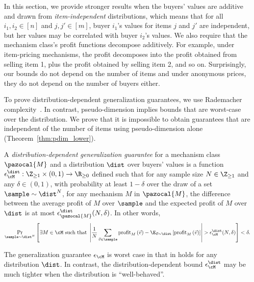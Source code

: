 
In this section, we provide stronger results when the buyers' values are additive and drawn from \emph{item-independent} distributions, which means that for all $i_1, i_2 \in [n]$ and $j ,j' \in [m]$, buyer $i_1$'s values for items $j$ and $j'$ are independent, but her values may be correlated with buyer $i_2$'s values. We also require that the mechanism class's profit functions decompose additively. For example, under item-pricing mechanisms, the profit decomposes into the profit obtained from selling item 1, plus the profit obtained by selling item 2, and so on. Surprisingly, our bounds do not depend on the number of items and under anonymous prices, they do not depend on the number of buyers either.



To prove distribution-dependent generalization guarantees, we use Rademacher complexity~\citep{Bartlett02:Rademacher,Koltchinskii01:Rademacher}. In contrast, pseudo-dimension implies bounds that are worst-case over the distribution.
We prove that it is impossible to obtain guarantees that are independent of the number of items using pseudo-dimension alone (Theorem~\ref{thm:pdim_lower}).

\begin{definition}\label{def:DD_gen_guar}
A \emph{distribution-dependent generalization guarantee} for a mechanism class $\pazocal{M}$ and a distribution $\dist$ over buyers' values is a function $\epsilon_{\cM}^\dist : \Z_{\geq 1} \times (0,1) \to \R_{\geq 0}$ defined such that for any sample size $N \in \Z_{\geq 1}$ and any $\delta \in (0,1)$, with probability at least $1-\delta$ over the draw of a set $\sample \sim \dist^N$, for any mechanism $M$ in $\pazocal{M}$, the difference between the average profit of $M$ over $\sample$ and the expected profit of $M$ over $\dist$ is at most $\epsilon_{\pazocal{M}}^\dist(N, \delta)$. In other words,
\[\Pr_{\sample \sim \dist^N} \left[\exists M \in \cM \text{ such that } \left|\frac{1}{N}\sum_{\vec{v} \in \sample} \profit_M\left(\vec{v}\right) - \E_{\vec{v} \sim \dist}\left[\profit_M\left(\vec{v}\right)\right]\right| > \epsilon_{\cM}^{\dist}(N, \delta) \right] < \delta.\]\end{definition}
The generalization guarantee $\epsilon_{\cM}$ is worst case in that in holds for any distribution $\dist$. In contrast, the distribution-dependent bound $\epsilon_{\cM}^{\dist}$ may be much tighter when the distribution is ``well-behaved''.

